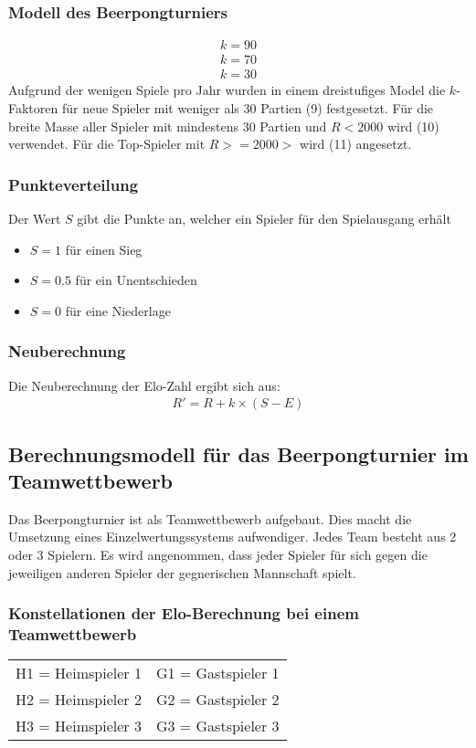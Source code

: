 \documentclass[a4paper, 12pt]{article}
\newcounter{arti}
\begin{document}
\subsubsection{Modell des Beerpongturniers}
\begin{align}
k=90
\\k=70
\\k=30
\end{align}
Aufgrund der wenigen Spiele pro Jahr wurden in einem dreistufiges Model die \(k\)-Faktoren für neue Spieler mit weniger als 30 Partien (9) festgesetzt. Für die breite Masse aller Spieler mit mindestens 30 Partien und \(R< 2000\) wird (10) verwendet. Für die Top-Spieler mit \(R>=2000>\) wird (11) angesetzt.
\subsubsection{Punkteverteilung}
Der Wert \(S\) gibt die Punkte an, welcher ein Spieler für den Spielausgang erhält
\begin{itemize}
\item \(S = 1\) für einen Sieg
\item \(S = 0.5\) für ein Unentschieden
\item \(S = 0\) für eine Niederlage
\end{itemize}

\subsubsection{Neuberechnung}
Die Neuberechnung der Elo-Zahl ergibt sich aus:
\begin{align}
R' = R + k\times(S-E)
\end{align}

\subsection{Berechnungsmodell für das Beerpongturnier im Teamwettbewerb}
Das Beerpongturnier ist als Teamwettbewerb aufgebaut. Dies macht die Umsetzung eines Einzelwertungssystems aufwendiger. Jedes Team besteht aus 2 oder 3 Spielern.
Es wird angenommen, dass jeder Spieler für sich gegen die jeweiligen anderen Spieler der gegnerischen Mannschaft spielt.
\subsubsection{Konstellationen der Elo-Berechnung bei einem Teamwettbewerb}
\begin{tabular}{lr}
H1 = Heimspieler 1 & G1 = Gastspieler 1 \\
H2 = Heimspieler 2 & G2 = Gastspieler 2 \\
H3 = Heimspieler 3 & G3 = Gastspieler 3 \\
\end{tabular}
\end{document}
